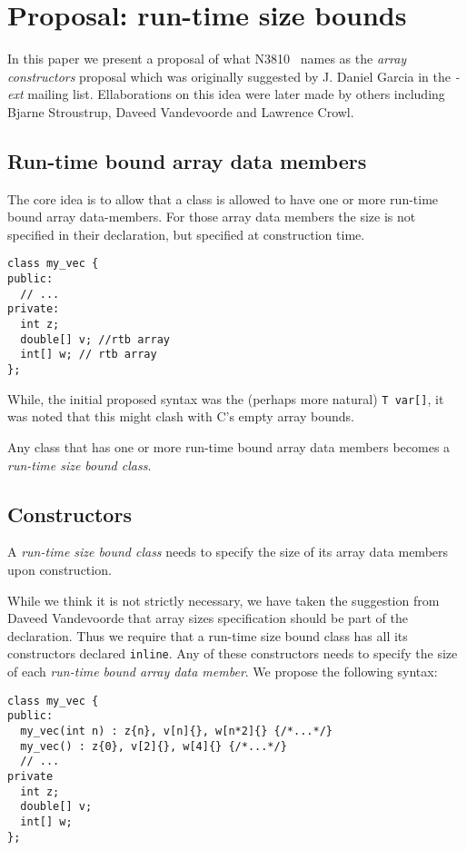 \section{Proposal: run-time size bounds}

In this paper we present a proposal of what N3810~\cite{n3810} names as the
\emph{array constructors} proposal which was originally suggested by J. Daniel
Garcia in the \emph{-ext} mailing list. Ellaborations on this idea were later
made by others including Bjarne Stroustrup, Daveed Vandevoorde and Lawrence
Crowl.

\subsection{Run-time bound array data members}

The core idea is to allow that a class is allowed to have one or more run-time
bound array data-members. For those array data members the size is not specified in their
declaration, but specified at construction time.

\begin{lstlisting}
class my_vec {
public:
  // ...
private:
  int z;
  double[] v; //rtb array
  int[] w; // rtb array
};
\end{lstlisting}

While, the initial proposed syntax was the (perhaps more natural) 
\verb+T var[]+, it was noted that this might clash with C's empty array bounds.

Any class that has one or more run-time bound array data members becomes a
\emph{run-time size bound class}.

\subsection{Constructors}

A \emph{run-time size bound class} needs to specify the size of its array data
members upon construction.

While we think it is not strictly necessary, we have taken the suggestion from
Daveed Vandevoorde that array sizes specification should be part of the
declaration. Thus we require that a run-time size bound class has all its
constructors declared \verb+inline+. Any of these constructors needs  to specify
the size of each \emph{run-time bound array data member}. We propose the
following syntax:

\begin{lstlisting}
class my_vec {
public:
  my_vec(int n) : z{n}, v[n]{}, w[n*2]{} {/*...*/}
  my_vec() : z{0}, v[2]{}, w[4]{} {/*...*/}
  // ...
private
  int z;
  double[] v;
  int[] w;
};
\end{lstlisting}

